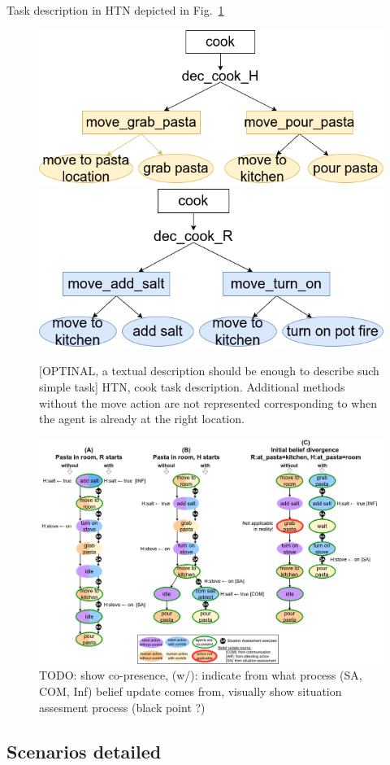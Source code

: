 \documentclass[letterpaper]{article} %
\begin{document}
Task description in HTN depicted in Fig.~\ref{fig:htn}

\begin{figure}
    \centering
    \includegraphics[width=0.4\linewidth]{figures/htn_human.png}
    \includegraphics[width=0.4\linewidth]{figures/htn_robot.png}
    \caption{[OPTINAL, a textual description should be enough to describe such simple task] HTN, cook task description. Additional methods without the move action are not represented corresponding to when the agent is already at the right location.}
    \label{fig:htn}
\end{figure}



\begin{figure}
    \centering
    \includegraphics[width=\linewidth]{figures/example_cook.png}
    \caption{TODO: show co-presence, (w/): indicate from what process (SA, COM, Inf) belief update comes from, visually show situation assesment process (black point ?)}
    \label{fig:scenarios}
\end{figure}


\subsection{Scenarios detailed}
\end{document}
